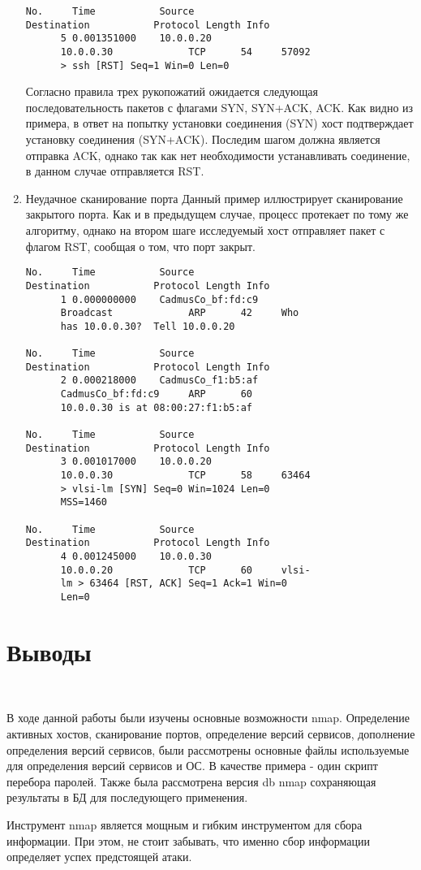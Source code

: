 \documentclass{article}
\begin{document}
\begin{enumerate}
\begin{verbatim}
No.     Time           Source                
Destination           Protocol Length Info
      5 0.001351000    10.0.0.20             
      10.0.0.30             TCP      54     57092 
      > ssh [RST] Seq=1 Win=0 Len=0
\end{verbatim}
Согласно правила трех рукопожатий ожидается следующая последовательность пакетов с флагами SYN, SYN+ACK, ACK. Как видно из примера, в ответ на попытку установки соединения (SYN) хост подтверждает установку соединения (SYN+ACK). Последим шагом должна является отправка ACK, однако так как нет необходимости устанавливать соединение, в данном случае отправляется RST.

\item Неудачное сканирование порта
Данный пример иллюстрирует сканирование закрытого порта. Как и в предыдущем случае, процесс протекает по тому же алгоритму, однако на втором шаге исследуемый хост отправляет пакет с флагом RST, сообщая о том, что порт закрыт.
\begin{verbatim}
No.     Time           Source                
Destination           Protocol Length Info
      1 0.000000000    CadmusCo_bf:fd:c9     
      Broadcast             ARP      42     Who 
      has 10.0.0.30?  Tell 10.0.0.20

No.     Time           Source                
Destination           Protocol Length Info
      2 0.000218000    CadmusCo_f1:b5:af     
      CadmusCo_bf:fd:c9     ARP      60     
      10.0.0.30 is at 08:00:27:f1:b5:af

No.     Time           Source                
Destination           Protocol Length Info
      3 0.001017000    10.0.0.20             
      10.0.0.30             TCP      58     63464 
      > vlsi-lm [SYN] Seq=0 Win=1024 Len=0 
      MSS=1460

No.     Time           Source                
Destination           Protocol Length Info
      4 0.001245000    10.0.0.30             
      10.0.0.20             TCP      60     vlsi-
      lm > 63464 [RST, ACK] Seq=1 Ack=1 Win=0 
      Len=0
\end{verbatim}

\end{enumerate}

\section{Выводы}
~

В ходе данной работы были изучены основные возможности nmap. Определение активных хостов, сканирование портов, определение версий сервисов, дополнение определения версий сервисов, были рассмотрены основные файлы используемые для определения версий сервисов и ОС. В качестве примера - один скрипт перебора паролей. Также была рассмотрена версия db nmap сохраняющая результаты в БД для последующего применения. 

Инструмент nmap является мощным и гибким инструментом для сбора информации. При этом, не стоит забывать, что именно сбор информации определяет успех предстоящей атаки.
 
\end{document}
